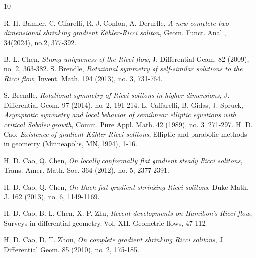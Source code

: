 \documentclass[12pt]{amsart}
\begin{document}
\vspace{0.5cm}	
	\begin{thebibliography}{10}
		
		 R. H. Bamler, C. Cifarelli, R. J. Conlon, A. Deruelle, {\em A new complete two-dimensional shrinking gradient K\"ahler-Ricci soliton}, Geom. Funct. Anal., 34(2024), no.2, 377-392.
		
%		
		B. L. Chen, {\em Strong uniqueness of the Ricci flow}, J. Differential Geom. 82 (2009), no. 2, 363-382.
		S. Brendle, {\em  Rotational symmetry of self-similar solutions to the Ricci flow}, Invent. Math. 194 (2013), no. 3, 731-764.
		
		S. Brendle, {\em Rotational symmetry of Ricci solitons in higher dimensions}, J. Differential Geom. 97 (2014), no. 2, 191-214.
		L. Caffarelli,  B. Gidas,    J. Spruck,   {\em Asymptotic symmetry and local behavior of semilinear elliptic equations with critical Sobolev growth}, Comm. Pure Appl. Math. 42 (1989), no. 3, 271-297.
		H. D. Cao, {\em Existence of gradient K\"ahler-Ricci solitons}, Elliptic and parabolic methods in geometry (Minneapolis, MN, 1994), 1-16.
		
		H. D. Cao, Q. Chen, {\em On locally conformally flat gradient steady Ricci solitons}, Trans. Amer. Math. Soc. 364 (2012), no. 5, 2377-2391.
		
		H. D. Cao, Q. Chen,     {\em On Bach-flat gradient shrinking Ricci solitons}, Duke Math. J. 162 (2013), no. 6, 1149-1169.
		
		H. D. Cao, B. L. Chen, X. P. Zhu, {\em Recent developments on Hamilton's Ricci flow}, Surveys in differential geometry. Vol. XII. Geometric flows, 47-112.
		
		H. D. Cao, D. T. Zhou, {\em On complete gradient shrinking Ricci solitons}, J. Differential Geom. 85 (2010), no. 2, 175-185.
		

\end{thebibliography}
\end{document}
